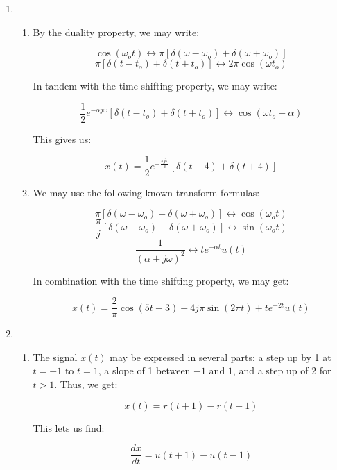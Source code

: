\begin{enumerate}

  \item

    \begin{enumerate}

      \item By the duality property, we may write:

        $$\cos(\omega_o t)\leftrightarrow \pi\left[ \delta(\omega-\omega_o)+\delta(\omega+\omega_o) \right]$$
        $$\pi\left[ \delta(t-t_o)+\delta(t+t_o) \right]\leftrightarrow 2\pi\cos(\omega t_o)$$

        In tandem with the time shifting property, we may write:

        $$\frac{1}{2}e^{-\alpha j\omega}\left[ \delta(t-t_o)+\delta(t+t_o) \right]\leftrightarrow \cos(\omega t_o-\alpha)$$

        This gives us:

        $$\boxed{x(t)=\frac{1}{2}e^{-\frac{\pi j \omega}{3}}\left[ \delta(t-4)+\delta(t+4) \right]}$$

      \item We may use the following known transform formulas:

        $$\pi\left[ \delta(\omega-\omega_o)+\delta(\omega+\omega_o) \right]\leftrightarrow \cos(\omega_o t)$$
        $$\frac{\pi}{j}\left[ \delta(\omega-\omega_o)-\delta(\omega+\omega_o) \right]\leftrightarrow \sin(\omega_o t)$$
        $$\frac{1}{(\alpha+j\omega)^2}\leftrightarrow te^{-\alpha t}u(t)$$

        In combination with the time shifting property, we may get:

        $$\boxed{x(t)=\frac{2}{\pi}\cos(5t-3)-4j\pi\sin(2\pi t)+te^{-2t}u(t)}$$

    \end{enumerate}

  \item

    \begin{enumerate}

      \item The signal $x(t)$ may be expressed in several parts: a step up by 1 at $t=-1$ to $t=1$, a slope of 1 between $-1$ and $1$, and a step up of $2$ for $t>1$. Thus, we get:

        $$\boxed{x(t)=r(t+1)-r(t-1)}$$

        This lets us find:

        $$\boxed{\frac{dx}{dt}=u(t+1)-u(t-1)}$$


\end{enumerate}
\end{enumerate}
